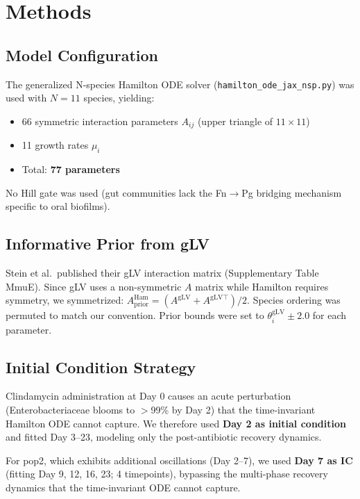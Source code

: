 \documentclass[11pt,a4paper]{article}
\begin{document}
\section{Methods}

\subsection{Model Configuration}

The generalized N-species Hamilton ODE solver (\texttt{hamilton\_ode\_jax\_nsp.py})
was used with $N = 11$ species, yielding:
\begin{itemize}
\item 66 symmetric interaction parameters $A_{ij}$ (upper triangle of $11 \times 11$)
\item 11 growth rates $\mu_i$
\item Total: \textbf{77 parameters}
\end{itemize}

No Hill gate was used (gut communities lack the Fn$\to$Pg bridging mechanism
specific to oral biofilms).

\subsection{Informative Prior from gLV}

Stein et al.\ published their gLV interaction matrix (Supplementary Table MmuE).
Since gLV uses a non-symmetric $A$ matrix while Hamilton requires symmetry,
we symmetrized: $A^\mathrm{Ham}_\mathrm{prior} = (A^\mathrm{gLV} + A^{\mathrm{gLV}\top})/2$.
Species ordering was permuted to match our convention. Prior bounds were set
to $\theta_i^\mathrm{gLV} \pm 2.0$ for each parameter.

\subsection{Initial Condition Strategy}

Clindamycin administration at Day 0 causes an acute perturbation
(Enterobacteriaceae blooms to $>$99\% by Day 2) that the time-invariant
Hamilton ODE cannot capture. We therefore used \textbf{Day 2 as initial condition}
and fitted Day 3--23, modeling only the post-antibiotic recovery dynamics.

For pop2, which exhibits additional oscillations (Day 2--7), we used
\textbf{Day 7 as IC} (fitting Day 9, 12, 16, 23; 4 timepoints), bypassing
the multi-phase recovery dynamics that the time-invariant ODE cannot capture.
\end{document}
